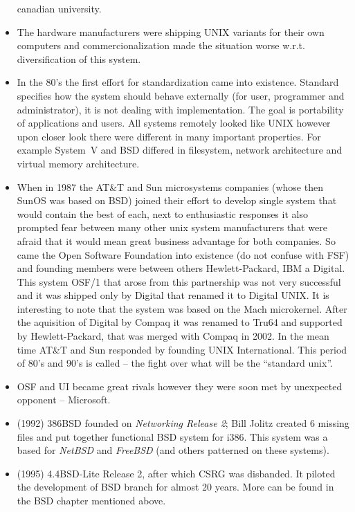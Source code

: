\begin{itemize}
canadian university.
\item The hardware manufacturers were shipping UNIX variants for their own
computers and commercionalization made the situation worse w.r.t.
diversification of this system.
\item In the 80's the first effort for standardization came into existence.
Standard specifies how the system should behave externally (for user, programmer
and administrator), it is not dealing with implementation. The goal is
portability of applications and users. All systems remotely looked like UNIX
however upon closer look there were different in many important properties.
For example System~V and BSD differed in filesystem, network architecture and
virtual memory architecture.
\item When in 1987 the AT\&T and Sun microsystems companies (whose then SunOS
was based on BSD) joined their effort to develop single system that would
contain the best of each, next to enthusiastic responses it also prompted fear
between many other unix system manufacturers that were afraid that it would mean
great business advantage for both companies. So came the Open Software
Foundation into existence (do not confuse with FSF) and founding members were
between others Hewlett-Packard, IBM a Digital. This system OSF/1 that arose from
this partnership was not very successful and it was shipped only by Digital that
renamed it to Digital UNIX. It is interesting to note that the system was based
on the Mach microkernel. After the aquisition of Digital by Compaq it was
renamed to Tru64 and supported by Hewlett-Packard, that was merged with
Compaq in 2002. In the mean time AT\&T and Sun responded by founding UNIX
International. This period of 80's and 90's is called  -- the
fight over what will be the ``standard unix''.
\item OSF and UI became great rivals however they were soon met by unexpected
opponent -- Microsoft.
\item (1992) 386BSD founded on \emph{Networking Release 2}; Bill Jolitz
created 6 missing files and put together functional BSD system for i386.
This system was a based for \emph{NetBSD} and \emph{FreeBSD} (and others
patterned on these systems).
\item (1995) 4.4BSD-Lite Release 2, after which CSRG was disbanded. It piloted
the development of BSD branch for almost 20 years. More can be found in the BSD
chapter mentioned above.
\end{itemize}

\endinput
